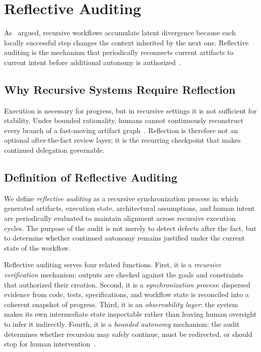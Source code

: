 \section{Reflective Auditing}
\label{sec:reflective-auditing}

As~ argued, recursive workflows accumulate latent divergence because each locally successful step changes the context inherited by the next one. Reflective auditing is the mechanism that periodically reconnects current artifacts to current intent before additional autonomy is authorized~\cite{Wiener1948Cybernetics,Beer1972BrainFirm}.

\subsection{Why Recursive Systems Require Reflection}

Execution is necessary for progress, but in recursive settings it is not sufficient for stability. Under bounded rationality, humans cannot continuously reconstruct every branch of a fast-moving artifact graph~\cite{Simon1957ModelsMan,Sweller1988CognitiveLoad}. Reflection is therefore not an optional after-the-fact review layer; it is the recurring checkpoint that makes continued delegation governable.

\subsection{Definition of Reflective Auditing}

We define \textit{reflective auditing} as a recursive synchronization process in which generated artifacts, execution state, architectural assumptions, and human intent are periodically evaluated to maintain alignment across recursive execution cycles. The purpose of the audit is not merely to detect defects after the fact, but to determine whether continued autonomy remains justified under the current state of the workflow.

Reflective auditing serves four related functions. First, it is a \textit{recursive verification} mechanism: outputs are checked against the goals and constraints that authorized their creation. Second, it is a \textit{synchronization process}: dispersed evidence from code, tests, specifications, and workflow state is reconciled into a coherent snapshot of progress. Third, it is an \textit{observability layer}: the system makes its own intermediate state inspectable rather than leaving human oversight to infer it indirectly. Fourth, it is a \textit{bounded autonomy} mechanism: the audit determines whether recursion may safely continue, must be redirected, or should stop for human intervention~\cite{Amershi2014InteractiveML,Shneiderman2020HCAI}.

